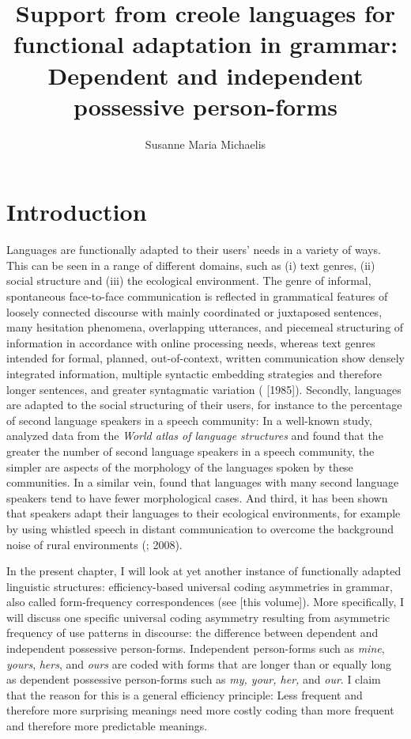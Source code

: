 \documentclass[output=paper]{langsci/langscibook}
\author{Susanne Maria Michaelis\affiliation{Leipzig University \& Max Planck Institute for the Science of Human History (Jena)}}
\title{Support from creole languages for functional adaptation in grammar: Dependent and independent possessive person-forms}
\begin{document}
\maketitle 




\section{Introduction}

Languages are functionally adapted to their users’ needs in a variety of ways. This can be seen in a range of different domains, such as (i) text genres, (ii) social structure and (iii) the ecological environment. The genre of informal, spontaneous face-to-face communication is reflected in grammatical features of loosely connected discourse with mainly coordinated or juxtaposed sentences, many hesitation phenomena, overlapping utterances, and piecemeal structuring of information in accordance with online processing needs, whereas text genres intended for formal, planned, out-of-context, written communication show densely integrated information, multiple syntactic embedding strategies and therefore longer sentences, and greater syntagmatic variation (\citealt{KochOesterreicher2012} [1985]). Secondly, languages are adapted to the social structuring of their users, for instance to the percentage of second language speakers in a speech community: In a well-known study, \citet{LupyanDale2010} analyzed data from the \textit{World atlas of language structures} \citep{HaspelmathEtAl2005} and found that the greater the number of second language speakers in a speech community, the simpler are aspects of the morphology of the languages spoken by these communities. In a similar vein, \citet{BentzWinter2013} found that languages with many second language speakers tend to have fewer morphological cases. And third, it has been shown that speakers adapt their languages to their ecological environments, for example by using whistled speech in distant communication to overcome the background noise of rural environments (\citealt{Meyer2005}; 2008). 

In the present chapter, I will look at yet another instance of functionally adapted linguistic structures: efficiency-based universal coding asymmetries in grammar, also called form-frequency correspondences (see \citealt{Haspelmath2018} [this volume]). More specifically, I will discuss one specific universal coding asymmetry resulting from asymmetric frequency of use patterns in discourse: the difference between dependent and independent possessive person-forms. Independent person-forms such as \textit{mine}, \textit{yours}, \textit{hers}, and \textit{ours} are coded with forms that are longer than or equally long as dependent possessive person-forms such as \textit{my, your, her,} and \textit{our}. I claim that the reason for this is a general efficiency principle: Less frequent and therefore more surprising meanings need more costly coding than more frequent and therefore more predictable meanings. 
\end{document}
